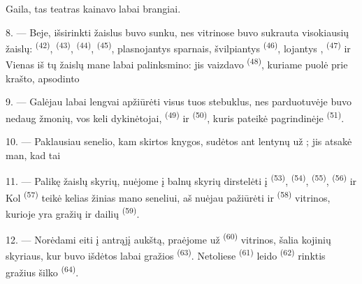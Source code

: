 Gaila, tas teatras kainavo labai brangiai.

8. --- Beje, išsirinkti žaislus buvo sunku, nes vitrinose buvo sukrauta visokiausių
žaislų:  \textsuperscript{(42)}, 
\textsuperscript{(43)},  \textsuperscript{(44)}, 
\textsuperscript{(45)}, plasnojantys sparnais, švilpiantys 
\textsuperscript{(46)}, lojantys , 
\textsuperscript{(47)} ir  Vienas iš tų žaislų mane labai
palinksmino: jis vaizdavo  \textsuperscript{(48)}, kuriame
 puolė  prie krašto, apsodinto 


9. --- Galėjau labai lengvai apžiūrėti visus tuos stebuklus, nes parduotuvėje buvo
nedaug žmonių, vos keli dykinėtojai,  \textsuperscript{(49)} ir
 \textsuperscript{(50)}, kuris pateikė 
pagrindinėje  \textsuperscript{(51)}.

10. --- Paklausiau senelio, kam skirtos knygos, sudėtos ant lentynų už
; jis atsakė man, kad tai 

\VUsaut{3.6mm}
\VUsaut{2.8mm}

11. --- Palikę žaislų skyrių, nuėjome į balnų skyrių dirstelėti į 
\textsuperscript{(53)},  \textsuperscript{(54)}, 
\textsuperscript{(55)},  \textsuperscript{(56)} ir  Kol
 \textsuperscript{(57)} teikė kelias žinias mano seneliui, aš
nuėjau pažiūrėti  ir  \textsuperscript{(58)}
vitrinos, kurioje yra gražių  ir dailių 
\textsuperscript{(59)}.

12. --- Norėdami eiti į antrąjį aukštą, praėjome už 
\textsuperscript{(60)} vitrinos, šalia kojinių skyriaus, kur buvo išdėtos labai gražios
 \textsuperscript{(63)}. Netoliese 
\textsuperscript{(61)} leido  \textsuperscript{(62)} rinktis gražius
šilko  \textsuperscript{(64)}.

